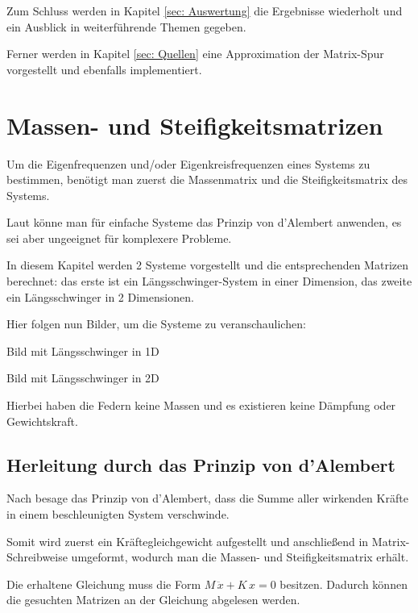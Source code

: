 \documentclass[ngerman,BCOR=4mm]{tudscrreprt}
\theoremstyle{plain} %
\theoremstyle{definition} %
\theoremstyle{remark}
\begin{document}
      Zum Schluss werden in Kapitel \ref{sec: Auswertung} die Ergebnisse wiederholt und ein Ausblick in weiterführende Themen gegeben.

      Ferner werden in Kapitel \ref{sec: Quellen} eine Approximation der Matrix-Spur vorgestellt und ebenfalls implementiert.

\chapter{Massen- und Steifigkeitsmatrizen}
\label{sec: MS Matrizen}
      Um die Eigenfrequenzen und/oder Eigenkreisfrequenzen \w eines Systems zu bestimmen, benötigt man zuerst die Massenmatrix \M und die Steifigkeitsmatrix \K des Systems.

      Laut \cite[S. 366]{maschinendynamikDresig} könne man für einfache Systeme das Prinzip von d'Alembert anwenden, es sei aber ungeeignet für komplexere Probleme.
            
      In diesem Kapitel werden 2 Systeme vorgestellt und die entsprechenden Matrizen berechnet:
      das erste ist ein Längsschwinger-System in einer Dimension, das zweite ein Längsschwinger in 2 Dimensionen.

      Hier folgen nun Bilder, um die Systeme zu veranschaulichen:

      Bild mit Längsschwinger in 1D

      Bild mit Längsschwinger in 2D

      Hierbei haben die Federn keine Massen und es existieren keine Dämpfung oder Gewichtskraft.

      \section{Herleitung durch das Prinzip von d'Alembert}
            Nach \cite{d_AlembertPrinzip} besage das Prinzip von d'Alembert, dass die Summe aller wirkenden Kräfte in einem beschleunigten System verschwinde.

            Somit wird zuerst ein Kräftegleichgewicht aufgestellt und anschließend in Matrix-Schreibweise umgeformt,
            wodurch man die Massen- und Steifigkeitsmatrix erhält.

            Die erhaltene Gleichung muss die Form $M\,\ddot x+K\,x = 0$ besitzen. Dadurch können die gesuchten Matrizen an der Gleichung abgelesen werden.
            
\end{document}
